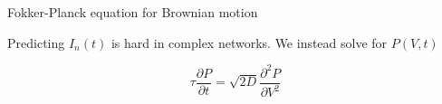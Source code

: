 \documentclass[aspectratio=169]{beamer}
\begin{document}
\begin{frame}{Fokker-Planck equation for Brownian motion}

\begin{figure}
\centering
{}
\end{figure}

Predicting $I_{n}(t)$ is hard in complex networks. We instead solve for $P(V,t)$

\begin{equation*}
\tau\frac{\partial P}{\partial t} = \sqrt{2D}\frac{\partial^{2}P}{\partial V^{2}}
\end{equation*}

\end{frame}
\end{document}
